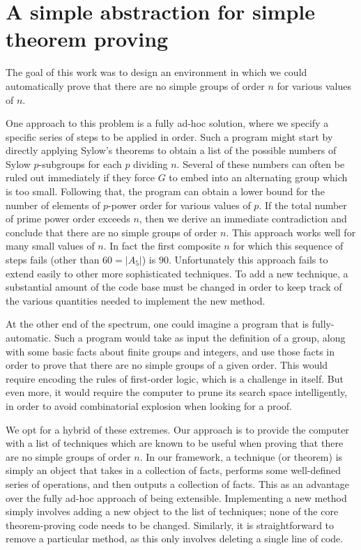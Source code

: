\documentclass[11pt,
oneside]{article} %
\begin{document}

\section{A simple abstraction for simple theorem proving}

The goal of this work was to design an environment in which we could automatically prove that there are no simple groups of order $n$ for various values of $n$.  

One approach to this problem is a fully ad-hoc solution, where we
specify a specific series of steps to be applied in order.  Such a
program might start by directly applying Sylow's theorems to obtain a
list of the possible numbers of Sylow $p$-subgroups for each $p$
dividing $n$.  Several of these numbers can often be ruled out
immediately if they force $G$ to embed into an alternating group which
is too small.  Following that, the program can obtain a lower bound
for the number of elements of $p$-power order for various values of
$p$.  If the total number of prime power order exceeds $n$, then we
derive an immediate contradiction and conclude that there are no
simple groups of order $n$.  This approach works well for many small
values of $n$.  In fact the first composite $n$ for which this
sequence of steps fails (other than $60 = |A_5|$) is $90.$
Unfortunately this approach fails to extend easily to other more
sophisticated techniques.  To add a new technique, a substantial
amount of the code base must be changed in order to keep track of the
various quantities needed to implement the new method.

At the other end of the spectrum, one could imagine a program that is
fully-automatic.  Such a program would take as input the definition of
a group, along with some basic facts about finite groups and integers,
and use those facts in order to prove that there are no simple groups
of a given order.  This would require encoding the rules of
first-order logic, which is a challenge in itself.  But even more, it
would require the computer to prune its search space intelligently, in
order to avoid combinatorial explosion when looking for a proof.

We opt for a hybrid of these extremes.  Our approach is to provide the
computer with a list of techniques which are known to be useful when
proving that there are no simple groups of order $n$.  In our
framework, a technique (or theorem) is simply an object that takes in
a collection of facts, performs some well-defined series of
operations, and then outputs a collection of facts.  This as an
advantage over the fully ad-hoc approach of being
extensible. Implementing a new method simply involves adding a new
object to the list of techniques; none of the core theorem-proving
code needs to be changed.  Similarly, it is straightforward to remove
a particular method, as this only involves deleting a single line of
code.
\end{document}
